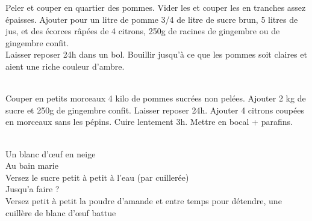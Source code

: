 \begin{minipage}[c]{\textwidth}
Peler et couper en quartier des pommes. Vider les et couper les en tranches assez épaisses. Ajouter pour un litre de pomme 3/4 de litre de sucre brun, 5 litres de jus, et des écorces râpées de 4 citrons, 250g de racines de gingembre ou de gingembre confit.\\
Laisser reposer 24h dans un bol. Bouillir jusqu'à ce que les pommes soit claires et aient une riche couleur d'ambre.\\
\\

\end{minipage}

\begin{minipage}[c]{\textwidth}
Couper en petits morceaux 4 kilo de pommes sucrées non pelées. Ajouter 2 kg de sucre et 250g de gingembre confit. Laisser reposer 24h. Ajouter  4 citrons coupées en morceaux sans les pépins. Cuire lentement 3h. Mettre en bocal + parafins.\\
\\

\end{minipage}

\begin{minipage}[c]{\textwidth}
Un blanc d'œuf en neige\\
Au bain marie\\
Versez le sucre petit à petit à l'eau (par cuillerée)\\
Jusqu’a faire ?\\
Versez petit à petit la poudre d'amande et entre temps pour détendre, une cuillère de blanc d'œuf battue\\
\\

\end{minipage}

